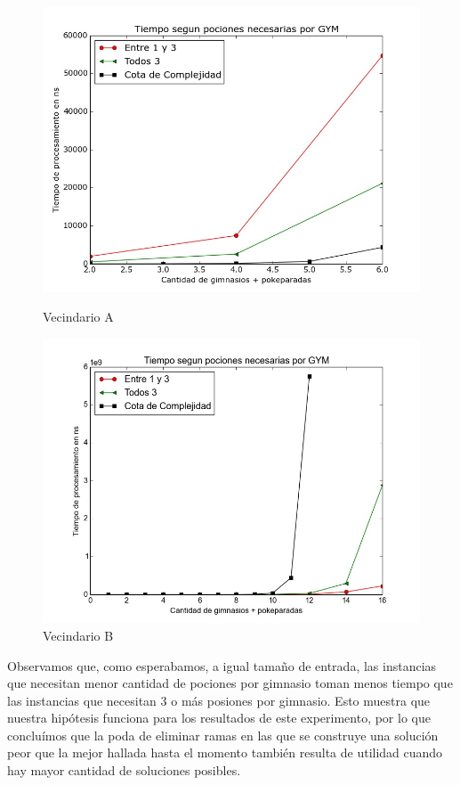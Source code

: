   \begin{figure}[H]
      \includegraphics[width=\linewidth]{imagenes/exp2_ej1_corto.jpeg}
      \caption{Vecindario A}
      \endminipage\hfill
      \includegraphics[width=\linewidth]{imagenes/exp2_ej1.jpeg}
      \caption{Vecindario B}
      \endminipage
  \end{figure}

      Observamos que, como esperabamos, a igual tamaño de entrada, las instancias que necesitan menor cantidad de pociones por gimnasio toman menos tiempo que las instancias que necesitan 3 o más posiones por gimnasio. Esto muestra que nuestra hipótesis funciona para los resultados de este experimento, por lo que concluímos que la poda de eliminar ramas en las que se construye una solución peor que la mejor hallada hasta el momento también resulta de utilidad cuando hay mayor cantidad de soluciones posibles. 

